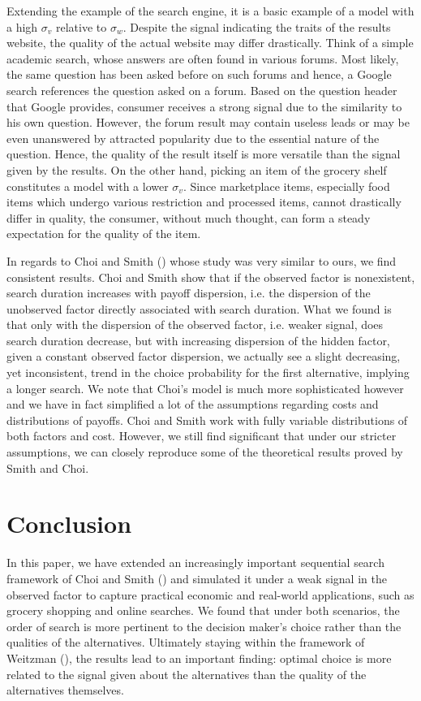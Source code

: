 \documentclass[12pt]{article}
\begin{document}
Extending the example of the search engine, it is a basic example of a model with a high \(\sigma_v\) relative to \(\sigma_w\). Despite the signal indicating the traits of the results website, the quality of the actual website may differ drastically. Think of a simple academic search, whose answers are often found in various forums. Most likely, the same question has been asked before on such forums and hence, a Google search references the question asked on a forum. Based on the question header that Google provides, consumer receives a strong signal due to the similarity to his own question. However, the forum result may contain useless leads or may be even unanswered by attracted popularity due to the essential nature of the question. Hence, the quality of the result itself is more versatile than the signal given by the results. On the other hand, picking an item of the grocery shelf constitutes a model with a lower \(\sigma_v\). Since marketplace items, especially food items which undergo various restriction and processed items, cannot drastically differ in quality, the consumer, without much thought, can form a steady expectation for the quality of the item.

In regards to Choi and Smith (\citeyear{Choi}) whose study was very similar to ours, we find consistent results. Choi and Smith show that if the observed factor is nonexistent, search duration increases with payoff dispersion, i.e. the dispersion of the unobserved factor directly associated with search duration. What we found is that only with the dispersion of the observed factor, i.e. weaker signal, does search duration decrease, but with increasing dispersion of the hidden factor, given a constant observed factor dispersion, we actually see a slight decreasing, yet inconsistent, trend in the choice probability for the first alternative, implying a longer search. We note that Choi's model is much more sophisticated however and we have in fact simplified a lot of the assumptions regarding costs and distributions of payoffs. Choi and Smith work with fully variable distributions of both factors and cost. However, we still find significant that under our stricter assumptions, we can closely reproduce some of the theoretical results proved by Smith and Choi.

\section{Conclusion}
In this paper, we have extended an increasingly important sequential search framework of Choi and Smith (\citeyear{Choi}) and simulated it under a weak signal in the observed factor to capture practical economic and real-world applications, such as grocery shopping and online searches. We found that under both scenarios, the order of search is more pertinent to the decision maker's choice rather than the qualities of the alternatives. Ultimately staying within the framework of Weitzman (\citeyear{weitzman}), the results lead to an important finding: optimal choice is more related to the signal given about the alternatives than the quality of the alternatives themselves.
\end{document}
